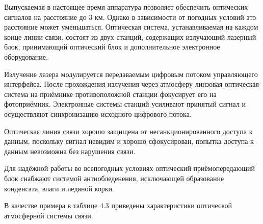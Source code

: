 \documentclass[
	a4paper,
	oneside,
	BCOR = 10mm,
	DIV = 12,
	12pt,
	headings = normal,
]{scrartcl}
\begin{document}
			Выпускаемая в настоящее время аппаратура позволяет обеспечить оптических сигналов на расстояние до 3 км. Однако в зависимости от погодных условий это расстояние может уменьшаться. Оптическая система, устанавливаемая на каждом конце линии связи, состоят из двух станций, содержащих излучающий лазерный блок, принимающий оптический блок и дополнительное электронное оборудование.

			Излучение лазера модулируется передаваемым цифровым потоком управляющего интерфейса. После прохождения излучения через атмосферу линзовая оптическая система на приёмнике противоположной станции фокусирует его на фотоприёмник. Электронные системы станций усиливают принятый сигнал и осуществляют синхронизацию исходного цифрового потока.

			Оптическая линия связи хорошо защищена от несанкционированного доступа к данным, поскольку сигнал невидим и хорошо сфокусирован, попытка доступа к данным невозможна без нарушения связи.

			Для надёжной работы во всепогодных условиях оптический приёмопередающий блок снабжают системой антиобледенения, исключающей образование конденсата, влаги и ледяной корки. 

			В качестве примера в таблице 4.3 приведены характеристики оптической атмосферной системы связи. 
\end{document}
